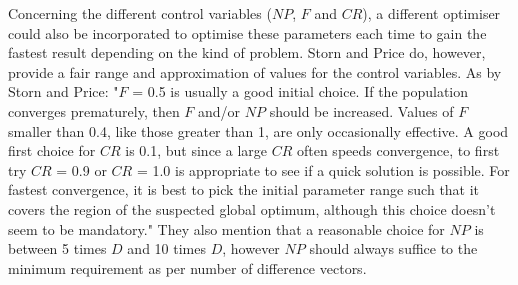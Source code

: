 Concerning the different control variables ($NP$, $F$ and $CR$), a different optimiser could also be incorporated to optimise these parameters each time to gain the fastest result depending on the kind of problem. Storn and Price \cite{storn1997differential} do, however, provide a fair range and approximation of values for the control variables. As by Storn and Price: "$F$ =
0.5 is usually a good initial choice. If the population converges prematurely, then $F$
and/or $NP$ should be increased. Values of $F$ smaller than 0.4, like those greater than
1, are only occasionally effective. A good first choice for $CR$ is 0.1, but since a
large $CR$ often speeds convergence, to first try $CR$ = 0.9 or $CR$ = 1.0 is appropriate
to see if a quick solution is possible. For fastest convergence, it is best
to pick the initial parameter range such that it covers the region of the suspected global optimum,
although this choice doesn’t seem to be mandatory." They also mention that a reasonable choice for $NP$ is between 5 times $D$ and 10 times $D$, however $NP$ should always suffice to the minimum requirement as per number of difference vectors. \\

